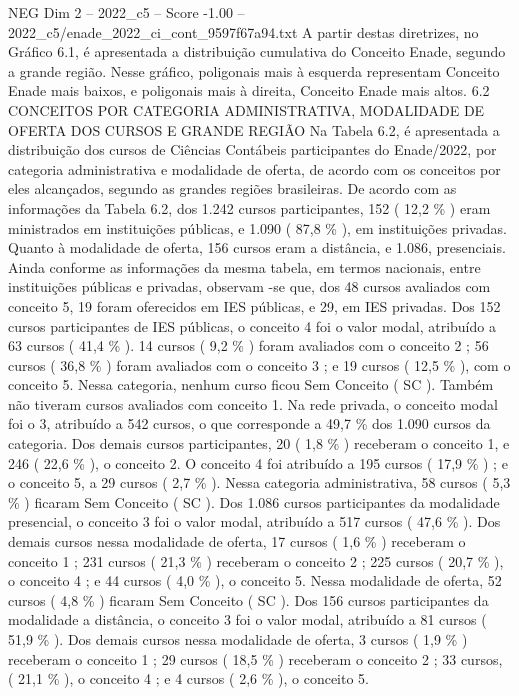 \begin{textsample}{NEG Dim 2 – 2022\_c5 – Score -1.00 – 2022\_c5/enade\_2022\_ci\_cont\_9597f67a94.txt}
A partir destas diretrizes, no Gráfico 6.1, é apresentada a distribuição cumulativa do Conceito Enade, segundo a grande região.
Nesse gráfico, poligonais mais à esquerda representam Conceito Enade mais baixos, e poligonais mais à direita, Conceito Enade mais altos. 6.2 CONCEITOS POR CATEGORIA ADMINISTRATIVA, MODALIDADE DE OFERTA DOS CURSOS E GRANDE REGIÃO Na Tabela 6.2, é apresentada a distribuição dos cursos de Ciências Contábeis participantes do Enade/2022, por categoria administrativa e modalidade de oferta, de acordo com os conceitos por eles alcançados, segundo as grandes regiões brasileiras.
De acordo com as informações da Tabela 6.2, dos 1.242 cursos participantes, 152 ( 12,2 \% ) eram ministrados em instituições públicas, e 1.090 ( 87,8 \% ), em instituições privadas.
Quanto à modalidade de oferta, 156 cursos eram a distância, e 1.086, presenciais.
Ainda conforme as informações da mesma tabela, em termos nacionais, entre instituições públicas e privadas, observam -se que, dos 48 cursos avaliados com conceito 5, 19 foram oferecidos em IES públicas, e 29, em IES privadas.
Dos 152 cursos participantes de IES públicas, o conceito 4 foi o valor modal, atribuído a 63 cursos ( 41,4 \% ). 14 cursos ( 9,2 \% ) foram avaliados com o conceito 2 ; 56 cursos ( 36,8 \% ) foram avaliados com o conceito 3 ; e 19 cursos ( 12,5 \% ), com o conceito 5.
Nessa categoria, nenhum curso ficou Sem Conceito ( SC ).
Também não tiveram cursos avaliados com conceito 1.
Na rede privada, o conceito modal foi o 3, atribuído a 542 cursos, o que corresponde a 49,7 \% dos 1.090 cursos da categoria.
Dos demais cursos participantes, 20 ( 1,8 \% ) receberam o conceito 1, e 246 ( 22,6 \% ), o conceito 2.
O conceito 4 foi atribuído a 195 cursos ( 17,9 \% ) ; e o conceito 5, a 29 cursos ( 2,7 \% ).
Nessa categoria administrativa, 58 cursos ( 5,3 \% ) ficaram Sem Conceito ( SC ).
Dos 1.086 cursos participantes da modalidade presencial, o conceito 3 foi o valor modal, atribuído a 517 cursos ( 47,6 \% ).
Dos demais cursos nessa modalidade de oferta, 17 cursos ( 1,6 \% ) receberam o conceito 1 ; 231 cursos ( 21,3 \% ) receberam o conceito 2 ; 225 cursos ( 20,7 \% ), o conceito 4 ; e 44 cursos ( 4,0 \% ), o conceito 5.
Nessa modalidade de oferta, 52 cursos ( 4,8 \% ) ficaram Sem Conceito ( SC ).
Dos 156 cursos participantes da modalidade a distância, o conceito 3 foi o valor modal, atribuído a 81 cursos ( 51,9 \% ).
Dos demais cursos nessa modalidade de oferta, 3 cursos ( 1,9 \% ) receberam o conceito 1 ; 29 cursos ( 18,5 \% ) receberam o conceito 2 ; 33 cursos, ( 21,1 \% ), o conceito 4 ; e 4 cursos ( 2,6 \% ), o conceito 5.

\end{textsample}
